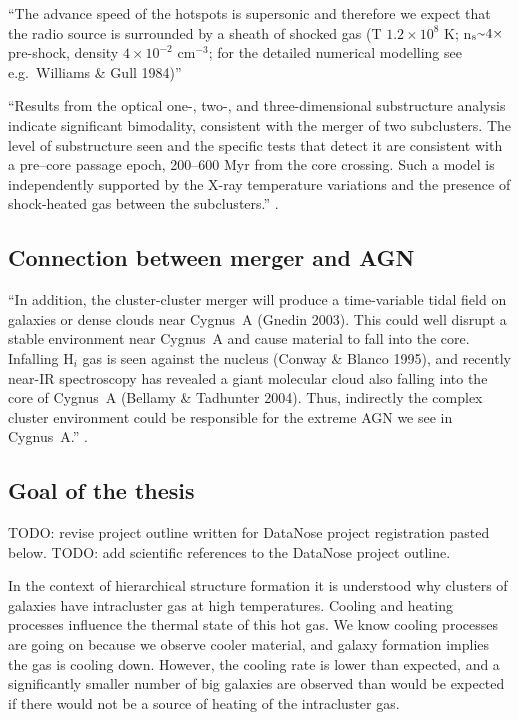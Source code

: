 \documentclass[MScProj_TLRH_ClusterEnergy.tex]{subfiles}
\begin{document}
``The advance speed of the hotspots is supersonic and therefore we expect that the radio source is surrounded by a sheath of shocked gas (T \mytilde $1.2 \times 10^8$ K; n$_{\rm s} \mytilde 4 \times$ pre-shock, density \mytilde $4 \times 10^{-2}$ cm$^{-3}$; for the detailed numerical modelling see e.g.\ Williams \& Gull 1984)'' \citep{1984MNRAS.211..981A}

``Results from the optical one-, two-, and three-dimensional substructure analysis indicate significant bimodality, consistent with the merger of two subclusters. The level of substructure seen and the specific tests that detect it are consistent with a pre–core passage epoch, 200–600 Myr from the core crossing. Such a model is independently supported by the X-ray temperature variations and the presence of shock-heated gas between the subclusters.'' \citep{2005AJ....130...47L}.

\subsection{Connection between merger and AGN}
``In addition, the cluster-cluster merger will produce a time-variable tidal field on galaxies or dense clouds near Cygnus~A (Gnedin 2003). This could well disrupt a stable environment near Cygnus~A and cause material to fall into the core. Infalling H$_{i}$ gas is seen against the nucleus (Conway \& Blanco 1995), and recently near-IR spectroscopy has revealed a giant molecular cloud also falling into the core of Cygnus~A (Bellamy \& Tadhunter 2004). Thus, indirectly the complex cluster environment could be responsible for the extreme AGN we see in Cygnus~A.''  \citep{2005AJ....130...47L}.


\subsection{Goal of the thesis}
TODO: revise project outline written for DataNose project registration pasted below.
TODO: add scientific references to the DataNose project outline.


In the context of hierarchical structure formation it is understood why clusters of galaxies have intracluster gas at high temperatures. Cooling and heating processes influence the thermal state of this hot gas. We know cooling processes are going on because we observe cooler material, and galaxy formation implies the gas is cooling down. However, the cooling rate is lower than expected, and a significantly smaller number of big galaxies are observed than would be expected if there would not be a source of heating of the intracluster gas.
\end{document}
